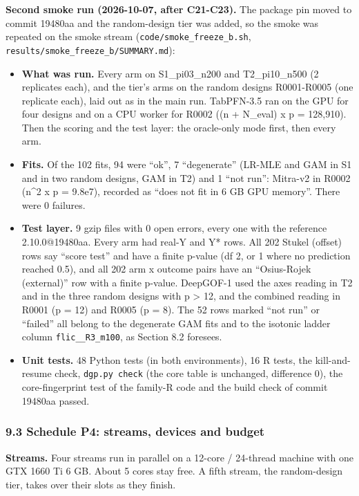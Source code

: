 \documentclass[
  10pt,
]{article}
\providecommand{\tightlist}{%
  \setlength{\itemsep}{0pt}\setlength{\parskip}{0pt}}
\begin{document}
\textbf{Second smoke run (2026-10-07, after C21-C23).} The
package pin moved to commit 19480aa and the random-design
tier was added, so the smoke was repeated on the smoke
stream (\texttt{code/smoke\_freeze\_b.sh},
\texttt{results/smoke\_freeze\_b/SUMMARY.md}):

\begin{itemize}
\tightlist
\item
  \textbf{What was run.} Every arm on S1\_pi03\_n200 and
  T2\_pi10\_n500 (2 replicates each), and the tier's arms on
  the random designs R0001-R0005 (one replicate each), laid
  out as in the main run. TabPFN-3.5 ran on the GPU for four
  designs and on a CPU worker for R0002 ((n + N\_eval) x p =
  128,910). Then the scoring and the test layer: the
  oracle-only mode first, then every arm.
\item
  \textbf{Fits.} Of the 102 fits, 94 were ``ok'', 7
  ``degenerate'' (LR-MLE and GAM in S1 and in two random
  designs, GAM in T2) and 1 ``not run'': Mitra-v2 in R0002
  (n\^{}2 x p = 9.8e7), recorded as ``does not fit in 6 GB
  GPU memory''. There were 0 failures.
\item
  \textbf{Test layer.} 9 gzip files with 0 open errors,
  every one with the reference 2.10.0@19480aa. Every arm had
  real-Y and Y* rows. All 202 Stukel (offset) rows say
  ``score test'' and have a finite p-value (df 2, or 1 where
  no prediction reached 0.5), and all 202 arm x outcome
  pairs have an ``Osius-Rojek (external)'' row with a finite
  p-value. DeepGOF-1 used the axes reading in T2 and in the
  three random designs with p \textgreater{} 12, and the
  combined reading in R0001 (p = 12) and R0005 (p = 8). The
  52 rows marked ``not run'' or ``failed'' all belong to the
  degenerate GAM fits and to the isotonic ladder column
  \texttt{flic\_\_R3\_m100}, as Section 8.2 foresees.
\item
  \textbf{Unit tests.} 48 Python tests (in both
  environments), 16 R tests, the kill-and-resume check,
  \texttt{dgp.py\ check} (the core table is unchanged,
  difference 0), the core-fingerprint test of the family-R
  code and the build check of commit 19480aa passed.
\end{itemize}

\subsubsection{9.3 Schedule P4: streams, devices and
budget}\label{schedule-p4-streams-devices-and-budget}

\textbf{Streams.} Four streams run in parallel on a 12-core
/ 24-thread machine with one GTX 1660 Ti 6 GB. About 5 cores
stay free. A fifth stream, the random-design tier, takes
over their slots as they finish.
\end{document}
